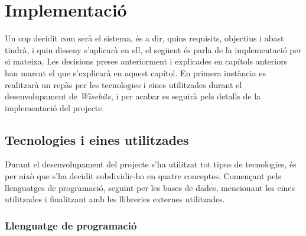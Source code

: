 
\chapter{Implementació} %

\label{Chapter7} %

Un cop decidit com serà el sistema, és a dir, quins requisits, objectius i abast tindrà, i quin disseny s'aplicarà en ell, el següent és parla de la implementació per si mateixa. Les decisions preses anteriorment i explicades en capítols anteriors han marcat el que s'explicarà en aquest capítol. En primera instància es realitzarà un repàs per les tecnologies i eines utilitzades durant el desenvolupament de \textit{Wisebite}, i per acabar es seguirà pels detalls de la implementació del projecte.


\section{Tecnologies i eines utilitzades}

Durant el desenvolupament del projecte s'ha utilitzat tot tipus de tecnologies, és per això que s'ha decidit subdividir-ho en quatre conceptes. Començant pels llenguatges de programació, seguint per les bases de dades, mencionant les eines utilitzades i finalitzant amb les llibreries externes utilitzades.

\subsection{Llenguatge de programació}

